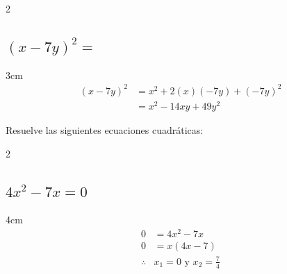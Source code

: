 \documentclass[12pt,addpoints,answers]{evalua}
\begin{document}
\begin{questions}
\begin{multicols}{2}
\begin{parts}

            \part {\Large $(x-7y)^2=$}

            \begin{solutionbox}{3cm}\large
                \begin{align*}
                    (x-7y)^2 & = x^2+2(x)(-7y)+(-7y)^2 \\
                             & = x^2-14xy+49y^2
                \end{align*}
            \end{solutionbox}





        \end{parts}
    \end{multicols}

    \question[10] Resuelve las siguientes ecuaciones cuadráticas:

    \begin{multicols}{2}
        \begin{parts}
            \part {\Large $4x^2-7x=0$}

            \begin{solutionbox}{4cm}
                \begin{align*}
                    0          & =	      4x^2-7x                    \\
                    0          & =		 x(4x -7)                       \\
                    \therefore & x_1 =0 \text{ y } x_2 =\frac{7}{4}
                \end{align*}
            \end{solutionbox}



\end{parts}
\end{multicols}
\end{questions}
\end{document}
